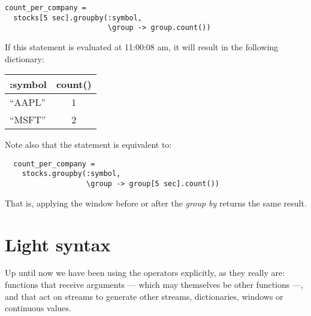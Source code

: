 \documentclass{report}
\begin{document}
\begin{verbatim}
count_per_company =
  stocks[5 sec].groupby(:symbol,
                        \group -> group.count())
\end{verbatim}

If this statement is evaluated at 11:00:08 am, it will result in the
following dictionary:

\begin{tabular}{ |l|c| }
  \hline
  :symbol & count() \\
  \hline
  ``AAPL'' & 1 \\
  ``MSFT'' & 2 \\
  \hline
\end{tabular}

Note also that the statement is equivalent to:

\begin{verbatim}
  count_per_company =
    stocks.groupby(:symbol,
                   \group -> group[5 sec].count())
\end{verbatim}

That is, applying the window before or after the \emph{group by}
returns the same result.

%
%
%
%

\section{Light syntax}
\label{sec:light-syntax}

Up until now we have been using the operators explicitly, as they
really are: functions that receive arguments --- which may themselves
be other functions ---, and that act on streams to generate other
streams, dictionaries, windows or continuous values.
\end{document}
